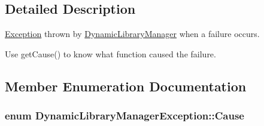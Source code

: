 \subsection{Detailed Description}
\hyperlink{class_exception}{Exception} thrown by \hyperlink{class_dynamic_library_manager}{Dynamic\+Library\+Manager} when a failure occurs. 

Use get\+Cause() to know what function caused the failure. 

\subsection{Member Enumeration Documentation}
\hypertarget{class_dynamic_library_manager_exception_a73b4694c152e0693fbc19fb04987a0b9}{
\subsubsection[{Cause}]{\setlength{\rightskip}{0pt plus 5cm}enum {\bf Dynamic\+Library\+Manager\+Exception\+::\+Cause}}}\label{class_dynamic_library_manager_exception_a73b4694c152e0693fbc19fb04987a0b9}
